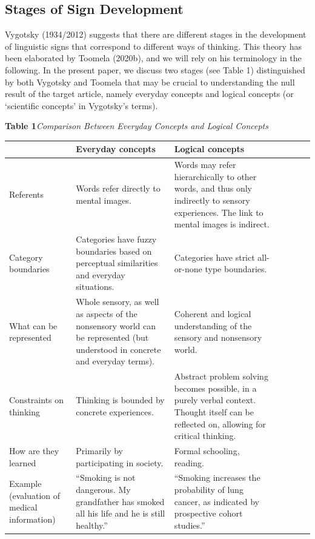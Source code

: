\documentclass[authordate, empirical]{jote-new-article}
\begin{document}
	\subsection{Stages of Sign Development}



	Vygotsky (1934/2012) suggests that there are different stages in the development of linguistic signs that correspond to different ways of thinking. This theory has been elaborated by Toomela (2020b), and we will rely on his terminology in the following. In the present paper, we discuss two stages (see Table 1) distinguished by both Vygotsky and Toomela that may be crucial to understanding the null result of the target article, namely everyday concepts and logical concepts (or ‘scientific concepts' in Vygotsky's terms).



	\textbf{Table 1}\emph{Comparison Between Everyday Concepts and Logical Concepts}

	\begin{table}
		\begin{tabularx}{\linewidth}{@{} l l l l l l l @{}}
			\hline   & Everyday concepts & Logical concepts \\

			\hline Referents & Words refer directly to mental images.  &
			Words may refer hierarchically to other words, and thus only indirectly to sensory experiences. The link to mental images is indirect.
			\\

			 Category boundaries &
			Categories have fuzzy boundaries based on perceptual similarities and everyday situations.
			& Categories have strict all-or-none type boundaries. \\

			 What can be represented &
			Whole sensory, as well as aspects of the nonsensory world can be represented (but understood in concrete and everyday terms).
			& Coherent and logical understanding of the sensory and nonsensory world.
			\\

			 Constraints on thinking & Thinking is bounded by concrete experiences. &
			Abstract problem solving becomes possible, in a purely verbal context. Thought itself can be reflected on, allowing for critical thinking.
			\\

			 How are they learned & Primarily by participating in society. &
			Formal schooling, reading. \\

			\hline Example (evaluation of medical information) & “Smoking is not dangerous. My grandfather has smoked all his life and he is still healthy.”
			& “Smoking increases the probability of lung cancer, as indicated by prospective cohort studies.”
			\\


		\end{tabularx}
	\end{table}
\end{document}
